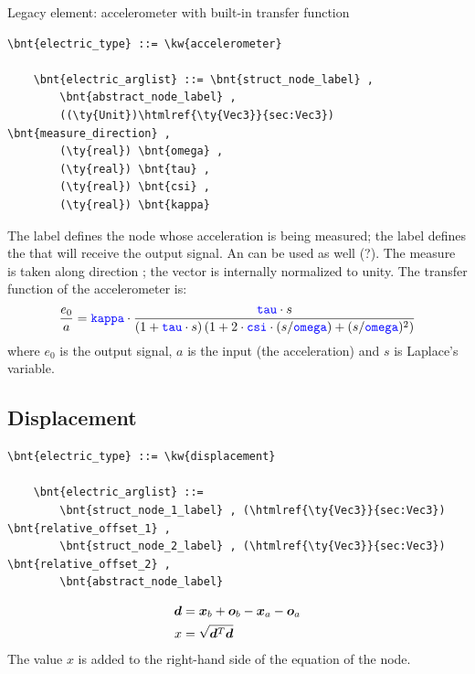 \noindent
Legacy element: accelerometer with built-in transfer function
\begin{Verbatim}[commandchars=\\\{\}]
    \bnt{electric_type} ::= \kw{accelerometer}

    \bnt{electric_arglist} ::= \bnt{struct_node_label} ,
        \bnt{abstract_node_label} ,
        ((\ty{Unit})\htmlref{\ty{Vec3}}{sec:Vec3}) \bnt{measure_direction} ,
        (\ty{real}) \bnt{omega} ,
        (\ty{real}) \bnt{tau} ,
        (\ty{real}) \bnt{csi} ,
        (\ty{real}) \bnt{kappa}	
\end{Verbatim}
The label  defines the node whose acceleration 
is being measured; the label  defines the
 that will receive the output signal. 
An  can be used as well (?).
The measure is taken along direction ;
the vector is internally normalized to unity.
The transfer function of the accelerometer is:
\begin{displaymath}
    \frac{e_0}{a} = \textcolor{blue}{\texttt{kappa}} \cdot \frac{\textcolor{blue}{\texttt{tau}} \cdot s}{
        \left( 1 + \textcolor{blue}{\texttt{tau}} \cdot s \right)
        \left( 1 + 2 \cdot \textcolor{blue}{\texttt{csi}} \cdot (s/\textcolor{blue}{\texttt{omega}}) + (s/\textcolor{blue}{\texttt{omega}})^2 \right)
    }
\end{displaymath}
where $ e_0 $ is the output signal, $ a $ is the input (the acceleration)
and $ s $ is Laplace's variable.



\subsection{Displacement}
\begin{Verbatim}[commandchars=\\\{\}]
    \bnt{electric_type} ::= \kw{displacement}

    \bnt{electric_arglist} ::=
        \bnt{struct_node_1_label} , (\htmlref{\ty{Vec3}}{sec:Vec3}) \bnt{relative_offset_1} ,
        \bnt{struct_node_2_label} , (\htmlref{\ty{Vec3}}{sec:Vec3}) \bnt{relative_offset_2} ,
        \bnt{abstract_node_label}
\end{Verbatim}
\begin{subequations}
\begin{align}
	\boldsymbol{d} &= \boldsymbol{x}_b + \boldsymbol{o}_b - \boldsymbol{x}_a - \boldsymbol{o}_a \\
	x &= \sqrt{\boldsymbol{d}^T \boldsymbol{d}}
\end{align}
\end{subequations}
The value $x$ is added to the right-hand side of the equation
of the  node.


